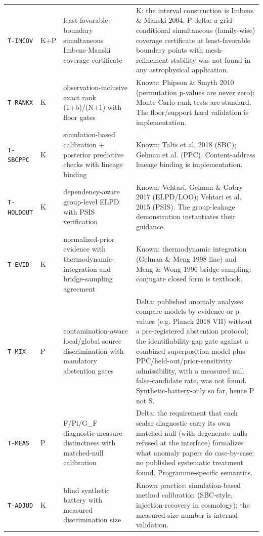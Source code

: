 \documentclass[10pt]{article}
\theoremstyle{definition}
\newcommand{\code}[1]{\texttt{\small #1}}
\begin{document}
\begin{center}
\begin{longtable}{p{2.0cm} p{0.7cm} p{5.4cm} p{6.5cm}}
\code{T-IMCOV} & K+P & least-favorable-boundary simultaneous Imbens-Manski coverage certificate & K: the interval construction is Imbens \& Manski 2004. P delta: a grid-conditional simultaneous (family-wise) coverage certificate at least-favorable boundary points with mesh-refinement stability was not found in any astrophysical application. \\[2pt]
\code{T-RANKX} & K & observation-inclusive exact rank (1+b)/(N+1) with floor gates & Known: Phipson \& Smyth 2010 (permutation p-values are never zero); Monte-Carlo rank tests are standard. The floor/support hard validation is implementation. \\[2pt]
\code{T-SBCPPC} & K & simulation-based calibration + posterior predictive checks with lineage binding & Known: Talts et al. 2018 (SBC); Gelman et al. (PPC). Content-address lineage binding is implementation. \\[2pt]
\code{T-HOLDOUT} & K & dependency-aware group-level ELPD with PSIS verification & Known: Vehtari, Gelman \& Gabry 2017 (ELPD/LOO); Vehtari et al. 2015 (PSIS). The group-leakage demonstration instantiates their guidance. \\[2pt]
\code{T-EVID} & K & normalized-prior evidence with thermodynamic-integration and bridge-sampling agreement & Known: thermodynamic integration (Gelman \& Meng 1998 line) and Meng \& Wong 1996 bridge sampling; conjugate closed form is textbook. \\[2pt]
\code{T-MIX} & P & contamination-aware local/global source discrimination with mandatory abstention gates & Delta: published anomaly analyses compare models by evidence or p-values (e.g. Planck 2018 VII) without a pre-registered abstention protocol; the identifiability-gap gate against a combined superposition model plus PPC/held-out/prior-sensitivity admissibility, with a measured null false-candidate rate, was not found. Synthetic-battery-only so far, hence P not S. \\[2pt]
\code{T-MEAS} & P & F/Pi/G\_F diagnostic-measure distinctness with matched-null calibration & Delta: the requirement that each scalar diagnostic carry its own matched null (with degenerate nulls refused at the interface) formalizes what anomaly papers do case-by-case; no published systematic treatment found. Programme-specific semantics. \\[2pt]
\code{T-ADJUD} & K & blind synthetic battery with measured discrimination size & Known practice: simulation-based method calibration (SBC-style, injection-recovery in cosmology); the measured-size number is internal validation. \\[2pt]

\end{longtable}
\end{center}
\end{document}
